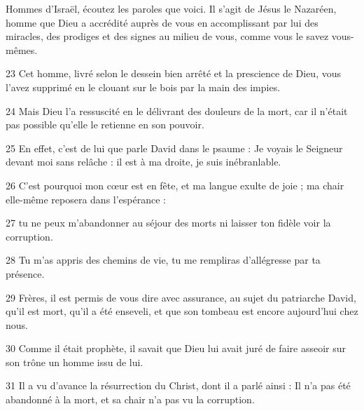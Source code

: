 Hommes d’Israël, écoutez les paroles que voici. Il s’agit de Jésus le Nazaréen, homme que Dieu a accrédité auprès de vous en accomplissant par lui des miracles, des prodiges et des signes au milieu de vous, comme vous le savez vous-mêmes.

23 Cet homme, livré selon le dessein bien arrêté et la prescience de Dieu, vous l’avez supprimé en le clouant sur le bois par la main des impies.

24 Mais Dieu l’a ressuscité en le délivrant des douleurs de la mort, car il n’était pas possible qu’elle le retienne en son pouvoir.

25 En effet, c’est de lui que parle David dans le psaume : Je voyais le Seigneur devant moi sans relâche : il est à ma droite, je suis inébranlable.

26 C’est pourquoi mon cœur est en fête, et ma langue exulte de joie ; ma chair elle-même reposera dans l’espérance :

27 tu ne peux m’abandonner au séjour des morts ni laisser ton fidèle voir la corruption.

28 Tu m’as appris des chemins de vie, tu me rempliras d’allégresse par ta présence.

29 Frères, il est permis de vous dire avec assurance, au sujet du patriarche David, qu’il est mort, qu’il a été enseveli, et que son tombeau est encore aujourd’hui chez nous.

30 Comme il était prophète, il savait que Dieu lui avait juré de faire asseoir sur son trône un homme issu de lui.

31 Il a vu d’avance la résurrection du Christ, dont il a parlé ainsi : Il n’a pas été abandonné à la mort, et sa chair n’a pas vu la corruption.